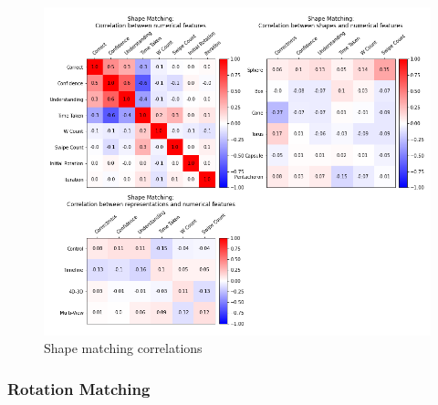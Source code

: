 \documentclass{l4proj}
\begin{document}
\begin{figure}[H]
  \includegraphics[width=\textwidth]{images/results/shape_matching_correlations.png}
  \caption{Shape matching correlations}
  \label{fig:shape_corr}
\end{figure}

\subsubsection{Rotation Matching}
\end{document}
